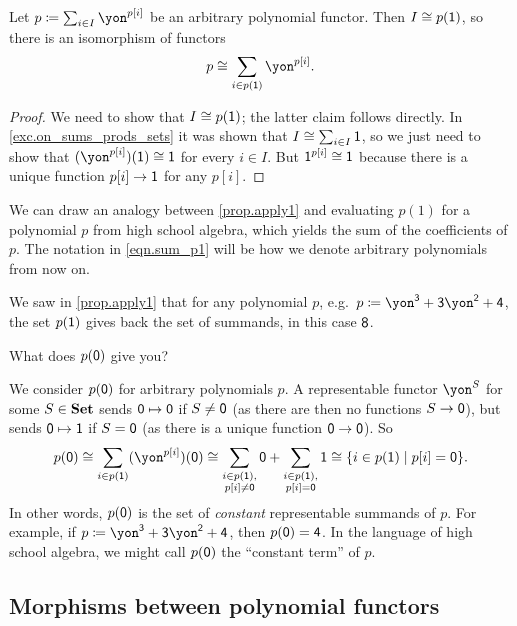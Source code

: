 \documentclass[Book-Poly]{subfiles}
\begin{document}
\begin{proposition}\label{prop.apply1}
Let $p\coloneqq\sum_{i\in I}\yon^{p[i]}$ be an arbitrary polynomial functor. Then $I\cong p(\textsf{1})$, so there is an isomorphism of functors
\begin{equation}\label{eqn.sum_p1}
p\cong\sum_{i\in p(\1)}\yon^{p[i]}.
\end{equation}
\end{proposition}
\begin{proof}
We need to show that $I\cong p(\textsf{1})$; the latter claim follows directly. In \cref{exc.on_sums_prods_sets} it was shown that $I\cong\sum_{i\in I}\textsf{1}$, so we just need to show that $(\yon^{p[i]})(\1)\iso\1$ for every $i \in I$. But $\textsf{1}^{p[i]}\cong \textsf{1}$ because there is a unique function $p[i]\to \textsf{1}$ for any $p[i]$.
\end{proof}
We can draw an analogy between \cref{prop.apply1} and evaluating $p(1)$ for a polynomial $p$ from high school algebra, which yields the sum of the coefficients of $p$.
The notation in \eqref{eqn.sum_p1} will be how we denote arbitrary polynomials from now on.

\begin{exercise}\label{exc.apply0}
We saw in \cref{prop.apply1} that for any polynomial $p$, e.g.\ $p\coloneqq\yon^\3+\3\yon^\2+\4$, the set $p(\textsf{1})$ gives back the set of summands, in this case $\textsf{8}$. 

What does $p(\textsf{0})$ give you?
\begin{solution}
We consider $p(\textsf{0})$ for arbitrary polynomials $p$.
A representable functor $\yon^S$ for some $S \in \textbf{Set}$ sends $\textsf{0} \mapsto \textsf{0}$ if $S \neq \textsf{0}$ (as there are then no functions $S \to \textsf{0}$), but sends $\textsf{0} \mapsto \textsf{1}$ if $S = \textsf{0}$ (as there is a unique function $\textsf{0} \to \textsf{0}$).
So
\[
    p(\0) \iso \sum_{i \in p(\1)} (\yon^{p[i]})(\0) \iso \sum_{\substack{i \in p(\1), \\ p[i] \neq \0}} \0 + \sum_{\substack{i \in p(\1), \\ p[i] = \0}} \1 \iso \{i \in p(\1) \mid p[i] = \0\}.
\]
In other words, $p(\textsf{0})$ is the set of \emph{constant} representable summands of $p$.
For example, if $p\coloneqq\yon^\3+\3\yon^\2+\4$, then $p(\textsf{0}) = \textsf{4}$.
In the language of high school algebra, we might call $p(\textsf{0})$ the ``constant term'' of $p$.
\end{solution}
\end{exercise}

\subsection{Morphisms between polynomial functors}
\label{subsec.understanding_mor_poly}
\end{document}

